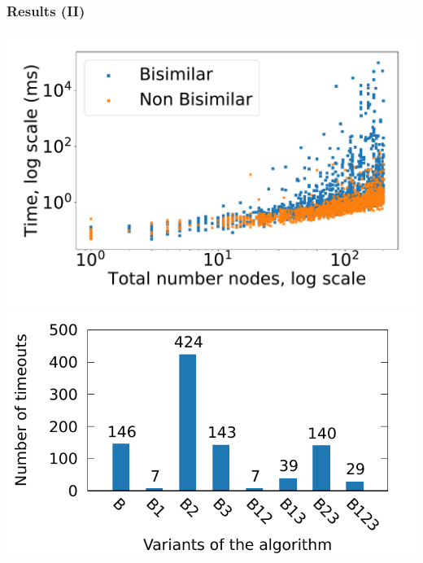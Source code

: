 \documentclass[10pt]{beamer}
\begin{document}
\begin{frame}
  \frametitle{Results (II)}
  \includegraphics[width=.55\textwidth]{img/nodes_time.pdf}%
  \includegraphics[width=.55\textwidth]{img/timeouts.pdf}
\end{frame}





\end{document}
